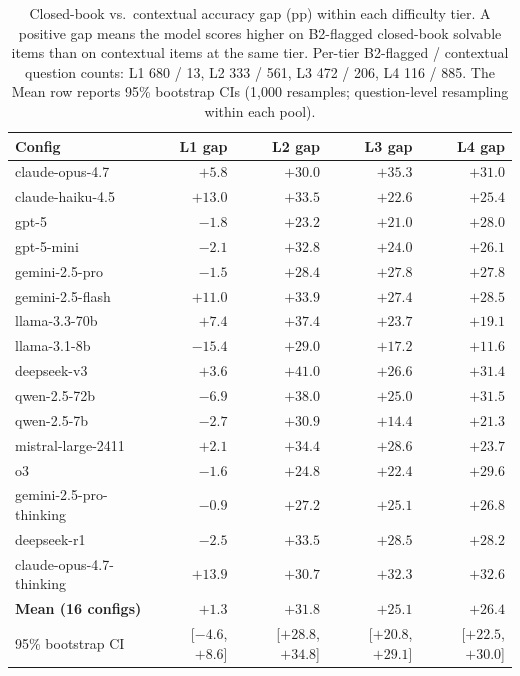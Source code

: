 \begin{table}[H]
  \centering
  \footnotesize
  \caption{Closed-book vs.\ contextual accuracy gap (pp) within each
    difficulty tier. A positive gap means the model scores higher on
    B2-flagged closed-book solvable items than on contextual items at
    the same tier. Per-tier B2-flagged / contextual question counts:
    L1 680 / 13, L2 333 / 561, L3 472 / 206, L4 116 / 885. The Mean
    row reports 95\% bootstrap CIs (1{,}000 resamples;
    question-level resampling within each pool).}
  \label{tab:cb-by-tier}
  \begin{tabular}{lrrrr}
    \toprule
    Config & L1 gap & L2 gap & L3 gap & L4 gap \\
    \midrule
    claude-opus-4.7              & $+5.8$  & $+30.0$ & $+35.3$ & $+31.0$ \\
    claude-haiku-4.5             & $+13.0$ & $+33.5$ & $+22.6$ & $+25.4$ \\
    gpt-5                        & $-1.8$  & $+23.2$ & $+21.0$ & $+28.0$ \\
    gpt-5-mini                   & $-2.1$  & $+32.8$ & $+24.0$ & $+26.1$ \\
    gemini-2.5-pro               & $-1.5$  & $+28.4$ & $+27.8$ & $+27.8$ \\
    gemini-2.5-flash             & $+11.0$ & $+33.9$ & $+27.4$ & $+28.5$ \\
    llama-3.3-70b                & $+7.4$  & $+37.4$ & $+23.7$ & $+19.1$ \\
    llama-3.1-8b                 & $-15.4$ & $+29.0$ & $+17.2$ & $+11.6$ \\
    deepseek-v3                  & $+3.6$  & $+41.0$ & $+26.6$ & $+31.4$ \\
    qwen-2.5-72b                 & $-6.9$  & $+38.0$ & $+25.0$ & $+31.5$ \\
    qwen-2.5-7b                  & $-2.7$  & $+30.9$ & $+14.4$ & $+21.3$ \\
    mistral-large-2411           & $+2.1$  & $+34.4$ & $+28.6$ & $+23.7$ \\
    o3                           & $-1.6$  & $+24.8$ & $+22.4$ & $+29.6$ \\
    gemini-2.5-pro-thinking      & $-0.9$  & $+27.2$ & $+25.1$ & $+26.8$ \\
    deepseek-r1                  & $-2.5$  & $+33.5$ & $+28.5$ & $+28.2$ \\
    claude-opus-4.7-thinking     & $+13.9$ & $+30.7$ & $+32.3$ & $+32.6$ \\
    \midrule
    \textbf{Mean (16 configs)}        & \textbf{$+1.3$}  & \textbf{$+31.8$} & \textbf{$+25.1$} & \textbf{$+26.4$} \\
    \footnotesize 95\% bootstrap CI    & \scriptsize [$-4.6$, $+8.6$] & \scriptsize [$+28.8$, $+34.8$] & \scriptsize [$+20.8$, $+29.1$] & \scriptsize [$+22.5$, $+30.0$] \\
    \bottomrule
  \end{tabular}
\end{table}

